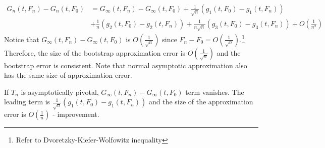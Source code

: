 \begin{align*}
G_n(t,F_n)-G_n(t,F_0)&=G_\infty(t,F_n)-G_\infty(t,F_0)+\frac{1}{\sqrt{n}}(g_1(t,F_0)-g_1(t,F_n))\\
&+\frac{1}{n}(g_2(t,F_0)-g_2(t,F_n))+\frac{1}{n\sqrt{n}}(g_3(t,F_0)-g_3(t,F_n))+O\left( \frac{1}{n^2}\right)
\end{align*}
Notice that $G_\infty(t,F_n)-G_\infty(t,F_0)$ is $O\left( \frac{1}{\sqrt{n}}\right)$ since $F_n-F_0=O\left(\frac{1}{\sqrt{n}}\right)$.\footnote{Refer to Dvoretzky-Kiefer-Wolfowitz inequality} Therefore, the size of the bootstrap approximation error is $O\left( \frac{1}{\sqrt{n}}\right)$ and the bootstrap error is consistent. Note that normal asymptotic approximation also has the same size of approximation error. \par
If $T_n$ is asymptotically pivotal, $G_\infty(t,F_n)-G_\infty(t,F_0)$ term vanishes. The leading term is $\frac{1}{\sqrt{n}}(g_1(t,F_0)-g_1(t,F_n))$ and the size of the approximation error is $O\left( \frac{1}{n}\right)$ - improvement.
